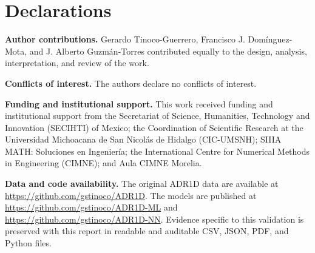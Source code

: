 \documentclass[11pt,a4paper]{article}
\begin{document}
\section*{Declarations}

\textbf{Author contributions.} Gerardo Tinoco-Guerrero, Francisco J.
Domínguez-Mota, and J. Alberto Guzmán-Torres contributed equally to the design,
analysis, interpretation, and review of the work.

\textbf{Conflicts of interest.} The authors declare no conflicts of interest.

\textbf{Funding and institutional support.} This work received funding and
institutional support from the Secretariat of Science, Humanities, Technology
and Innovation (SECIHTI) of Mexico; the Coordination of Scientific Research at
the Universidad Michoacana de San Nicolás de Hidalgo (CIC-UMSNH); SIIIA MATH:
Soluciones en Ingeniería; the International Centre for Numerical Methods in
Engineering (CIMNE); and Aula CIMNE Morelia.

\textbf{Data and code availability.} The original ADR1D data are available at
\url{https://github.com/gstinoco/ADR1D}. The models are published at
\url{https://github.com/gstinoco/ADR1D-ML} and
\url{https://github.com/gstinoco/ADR1D-NN}. Evidence specific to this validation
is preserved with this report in readable and auditable CSV, JSON, PDF, and
Python files.
\end{document}

